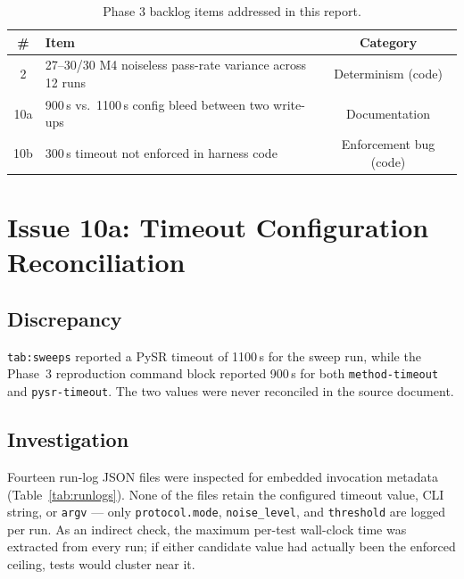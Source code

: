\documentclass[11pt]{article}
\begin{document}
\begin{table}[h]
\centering
\caption{Phase 3 backlog items addressed in this report.}
\label{tab:backlog}
\begin{tabular}{@{}clc@{}}
\toprule
\textbf{\#} & \textbf{Item} & \textbf{Category} \\
\midrule
2   & 27--30/30 M4 noiseless pass-rate variance across 12 runs & Determinism (code) \\
10a & 900\,s vs.\ 1100\,s config bleed between two write-ups   & Documentation \\
10b & 300\,s timeout not enforced in harness code              & Enforcement bug (code) \\
\bottomrule
\end{tabular}
\end{table}

\section{Issue 10a: Timeout Configuration Reconciliation}
\label{sec:10a}

\subsection{Discrepancy}

\texttt{tab:sweeps} reported a PySR timeout of 1100\,s for the sweep run,
while the Phase~3 reproduction command block reported 900\,s for both
\texttt{method-timeout} and \texttt{pysr-timeout}. The two values were
never reconciled in the source document.

\subsection{Investigation}

Fourteen run-log JSON files were inspected for embedded invocation
metadata (Table~\ref{tab:runlogs}). None of the files retain the
configured timeout value, CLI string, or \texttt{argv} — only
\texttt{protocol.mode}, \texttt{noise\_level}, and \texttt{threshold} are
logged per run. As an indirect check, the maximum per-test wall-clock
time was extracted from every run; if either candidate value had actually
been the enforced ceiling, tests would cluster near it.
\end{document}
